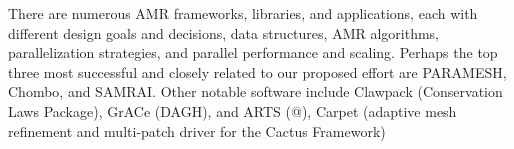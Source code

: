 \documentclass[14pt,letter]{article}
\begin{document}

There are numerous AMR frameworks, libraries, and applications, each
with different design goals and decisions, data structures, AMR
algorithms, parallelization strategies, and parallel performance and
scaling.  Perhaps the top three most successful and closely related to
our proposed effort are PARAMESH, Chombo, and SAMRAI.  Other notable
software include Clawpack (Conservation Laws Package), GrACe (DAGH),
and ARTS (@), Carpet (adaptive mesh refinement and multi-patch driver
for the Cactus Framework)
\end{document}
